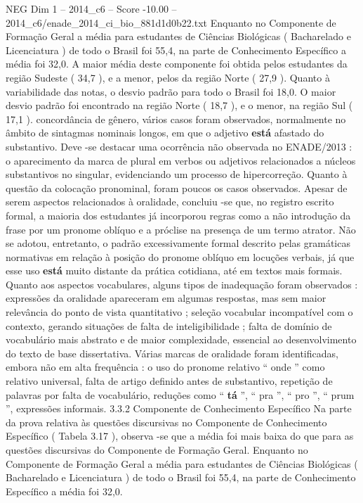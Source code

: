 \begin{textsample}{NEG Dim 1 – 2014\_c6 – Score -10.00 – 2014\_c6/enade\_2014\_ci\_bio\_881d1d0b22.txt}
Enquanto no Componente de Formação Geral a média para estudantes de Ciências Biológicas ( Bacharelado e Licenciatura ) de todo o Brasil foi 55,4, na parte de Conhecimento Específico a média foi 32,0.
A maior média deste componente foi obtida pelos estudantes da região Sudeste ( 34,7 ), e a menor, pelos da região Norte ( 27,9 ).
Quanto à variabilidade das notas, o desvio padrão para todo o Brasil foi 18,0.
O maior desvio padrão foi encontrado na região Norte ( 18,7 ), e o menor, na região Sul ( 17,1 ). concordância de gênero, vários casos foram observados, normalmente no âmbito de sintagmas nominais longos, em que o adjetivo \textbf{está} afastado do substantivo.
Deve -se destacar uma ocorrência não observada no ENADE/2013 : o aparecimento da marca de plural em verbos ou adjetivos relacionados a núcleos substantivos no singular, evidenciando um processo de hipercorreção.
Quanto à questão da colocação pronominal, foram poucos os casos observados.
Apesar de serem aspectos relacionados à oralidade, concluiu -se que, no registro escrito formal, a maioria dos estudantes já incorporou regras como a não introdução da frase por um pronome oblíquo e a próclise na presença de um termo atrator.
Não se adotou, entretanto, o padrão excessivamente formal descrito pelas gramáticas normativas em relação à posição do pronome oblíquo em locuções verbais, já que esse uso \textbf{está} muito distante da prática cotidiana, até em textos mais formais.
Quanto aos aspectos vocabulares, alguns tipos de inadequação foram observados : expressões da oralidade apareceram em algumas respostas, mas sem maior relevância do ponto de vista quantitativo ; seleção vocabular incompatível com o contexto, gerando situações de falta de inteligibilidade ; falta de domínio de vocabulário mais abstrato e de maior complexidade, essencial ao desenvolvimento do texto de base dissertativa.
Várias marcas de oralidade foram identificadas, embora não em alta frequência : o uso do pronome relativo “ onde ” como relativo universal, falta de artigo definido antes de substantivo, repetição de palavras por falta de vocabulário, reduções como “ \textbf{tá} ”, “ pra ”, “ pro ”, “ prum ”, expressões informais. 3.3.2 Componente de Conhecimento Específico Na parte da prova relativa às questões discursivas no Componente de Conhecimento Específico ( Tabela 3.17 ), observa -se que a média foi mais baixa do que para as questões discursivas do Componente de Formação Geral.
Enquanto no Componente de Formação Geral a média para estudantes de Ciências Biológicas ( Bacharelado e Licenciatura ) de todo o Brasil foi 55,4, na parte de Conhecimento Específico a média foi 32,0.

\end{textsample}
